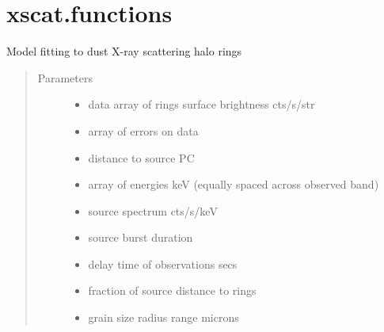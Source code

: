 \documentclass[letterpaper,10pt,english]{sphinxmanual}
\begin{document}
\section{xscat.functions}
\label{\detokenize{xscat_functions:module-xscat}}\label{\detokenize{xscat_functions:xscat-functions}}\label{\detokenize{xscat_functions::doc}}

\begin{fulllineitems}
\label{\detokenize{xscat_functions:xscat.dustrings}}
Model fitting to dust X-ray scattering halo rings
\begin{quote}\begin{description}
\item[{Parameters}] \leavevmode\begin{itemize}
\item {} 
 \textendash{} data array of rings surface brightness cts/s/str

\item {} 
 \textendash{} array of errors on data

\item {} 
 \textendash{} distance to source PC

\item {} 
 \textendash{} array of energies keV (equally spaced across observed band)

\item {} 
 \textendash{} source spectrum cts/s/keV

\item {} 
 \textendash{} source burst duration

\item {} 
 \textendash{} delay time of observations secs

\item {} 
 \textendash{} fraction of source distance to rings

\item {} 
\sphinxstyleliteralstrong{\sphinxupquote{,}} \textendash{} grain size radius range microns


\end{itemize}
\end{description}
\end{quote}
\end{fulllineitems}
\end{document}
